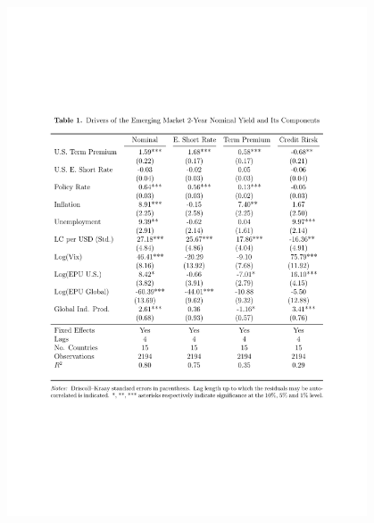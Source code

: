 \documentclass[12pt, aspectratio=169, xcolor=dvipsnames]{beamer}
\begin{document}
\begin{frame}
\vspace{-0.8cm}
\begin{figure}[!htbp]
\begin{center} %
\includegraphics[trim={2cm 7.2cm 2cm 4cm},clip, width=0.95\textwidth,height=1.15\textheight]{../Tables/ycdcmp2y.pdf}
\par\end{center}
\end{figure}
\end{frame}
\end{document}

